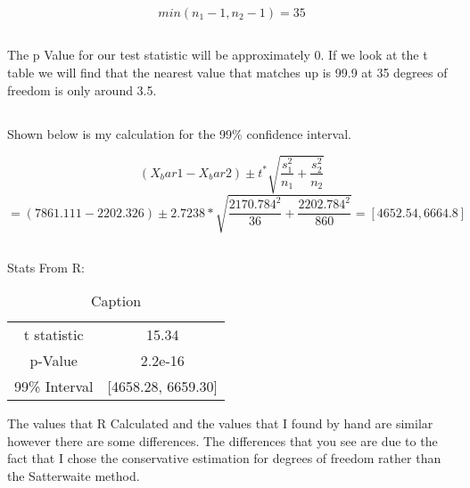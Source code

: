 \documentclass[letterpaper, onecolumn,10pt]{IEEEtran}
\begin{document}
                    \[
                        min(n_1 - 1, n_2 -1) = 35
                    \]
                \subsection{}
                    The p Value for our test statistic will be approximately 0. If we look at the t table we will find that the nearest value that matches up is 99.9 at 35 degrees of freedom is only around 3.5.\\
                
                \subsection{}
                    Shown below is my calculation for the 99\% confidence interval.
                    
                    \[
                        (X_bar1 - X_bar2) \pm t^* \sqrt{\dfrac{s^2_1}{n_1}+\dfrac{s^2_2}{n_2}}
                    \]
                    \[
                        = (7861.111 - 2202.326) \pm  2.7238 * \sqrt{\dfrac{2170.784^2}{36}+\dfrac{2202.784^2}{860}} = [4652.54, 6664.8]
                    \]
                \subsection{}
                    Stats From R:
                    \begin{table}[]
                        \centering
                        \begin{tabular}{c|c}
                            t statistic & 15.34\\
                            p-Value & 2.2e-16\\
                            99\% Interval & [4658.28, 6659.30]\\
                        \end{tabular}
                        \caption{Caption}
                        \label{tab:my_label}
                    \end{table}
                    
                    The values that R Calculated and the values that I found by hand are similar however there are some differences. The differences that you see are due to the fact that I chose the conservative estimation for degrees of freedom rather than the Satterwaite method.\\
            
\end{document}
